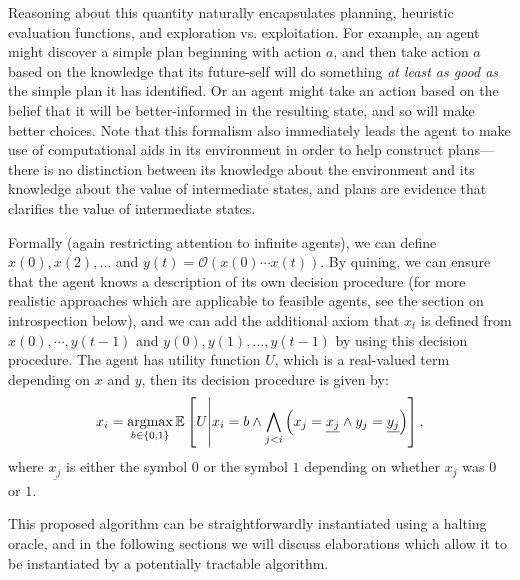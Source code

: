 \documentclass[12pt]{article}
\theoremstyle{definition}
\newcommand{\argmax}{\operatornamewithlimits{argmax}}
\renewcommand{\O}{\mathcal{O}}
\newcommand{\Of}[1]{\O\of{#1}}
\newcommand{\of}[1]{\left(#1\right)}
\renewcommand{\b}[1]{\left\{#1\right\}}
\newcommand{\Ec}[2]{\mathbb{E}\left[#1\middle\vert #2\right]}
\begin{document}
Reasoning about this quantity naturally encapsulates planning,
heuristic evaluation functions,
and
exploration vs. exploitation.
For example, an agent might discover a simple plan beginning
with action $a$, and then take action $a$ based on the knowledge
that its future-self will do something \emph{at least as good as}
the simple plan it has identified.
Or an agent might take an action based on the belief
that it will be better-informed in the resulting state,
and so will make better choices.
Note that this formalism also immediately leads the agent
to make use of computational aids in its environment
in order to help construct plans---there is no
distinction between its knowledge about the environment
and its knowledge about the value of intermediate states,
and plans are evidence that clarifies the value of intermediate states.

Formally (again restricting attention to infinite agents), 
we can define $x(0), x(2), \ldots$ and $y(t) = \Of{x(0) \cdots x(t)}$.
By quining, we can ensure that the agent knows a description
of its own decision procedure (for more realistic approaches
which are applicable to feasible agents, see the section on introspection below),
and we can add the additional axiom that $x_t$ is defined from $x(0), \cdots, y(t-1)$
and $y(0), y(1), \ldots, y(t-1)$ by using this decision procedure.
The agent has utility function $U$, which is a real-valued term
depending on $x$ and $y$, then its decision procedure is given by:
\[ x_i = \argmax_{b \in \b{0, 1}} \Ec{U}{x_i = b \wedge \bigwedge\limits_{j < i} 
\of{x_j = \underline{x_j} \wedge y_j = \underline{y_j}}},\]
where $\underline{x_j}$ is either the symbol $0$ or the symbol $1$
depending on whether $x_j$ was $0$ or $1$.

This proposed algorithm can be straightforwardly instantiated using a halting oracle,
and in the following sections we will discuss elaborations which allow it to be
instantiated by a potentially tractable algorithm. 
\end{document}

